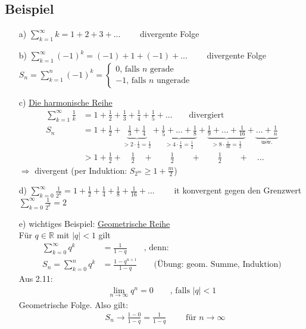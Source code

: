 \documentclass[12pt, titlepage]{article}
\newcommand{\R}{\mathds{R}}
\newcommand{\infn}{n\rightarrow\infty}
\renewcommand{\*}{\cdot}
\begin{document}
	\subsection{Beispiel}
	\begin{itemize}
		\item[a)] $\sum_{k=1}^{\infty}k=1+2+3+...\qquad$ divergente Folge
		\item[b)] $\sum_{k=1}^{\infty}(-1)^k=(-1)+1+(-1)+...\qquad$ divergente Folge\\
		$S_n=\sum_{k=1}^{n}(-1)^k=\begin{cases}
		0\textrm{, falls }n\textrm{ gerade}\\
		-1\textrm{, falls }n\textrm{ ungerade}
		\end{cases}$
		\item[c)] \underline{Die harmonische Reihe}
		\begin{align*}
			\sum_{k=1}^{\infty}\frac{1}{k}&=1+\frac{1}{2}+\frac{1}{3}+\frac{1}{4}+\frac{1}{5}+...\qquad\textrm{divergiert}\\
			S_n&=1+\frac{1}{2}+\underbrace{\frac{1}{3}+\frac{1}{4}}_{>2\*\frac{1}{4}=\frac{1}{2}}+\underbrace{\frac{1}{5}+...+\frac{1}{8}}_{>4\*\frac{1}{8}=\frac{1}{2}}+\underbrace{\frac{1}{9}+...+\frac{1}{16}}_{>8\*\frac{1}{16}=\frac{1}{2}}+\underbrace{...+\frac{1}{n}}_{\textrm{usw.}}\\
			&>1+\frac{1}{2}+\quad\frac{1}{2}\quad+\qquad\frac{1}{2}\qquad+\qquad\frac{1}{2}\qquad+\quad...
		\end{align*}
		$\Rightarrow$ divergent (per Induktion: $S_{2^m}\geq1+\frac{m}{2}$)
		\item[d)] $\sum_{k=0}^{\infty}\frac{1}{2^k}=1+\frac{1}{2}+\frac{1}{4}+\frac{1}{8}+\frac{1}{16}+...\qquad$ it konvergent gegen den Grenzwert $\sum_{k=0}^{\infty}\frac{1}{2^k}=2$
		\item[e)] wichtiges Beispiel: \underline{Geometrische Reihe}\\
		Für $q\in\R$ mit $|q|<1$ gilt
		\begin{align*}
			\sum_{k=0}^{\infty}q^k&=\frac{1}{1-q}\qquad\textrm{, denn:}\\
			S_n=\sum_{k=0}^{n}q^k&=\frac{1-q^{n+1}}{1-q}\qquad\textrm{(Übung: geom. Summe, Induktion)}
		\end{align*}
		Aus 2.11:
		\begin{align*}
			\lim\limits_{\infn}q^n=0\qquad\textrm{, falls }|q|<1
		\end{align*}
		Geometrische Folge. Also gilt:
		\begin{align*}
			&S_n\rightarrow\frac{1-0}{1-q}=\frac{1}{1-q}\qquad\textrm{ für }\infn\\

\end{align*}
\end{itemize}
\end{document}
